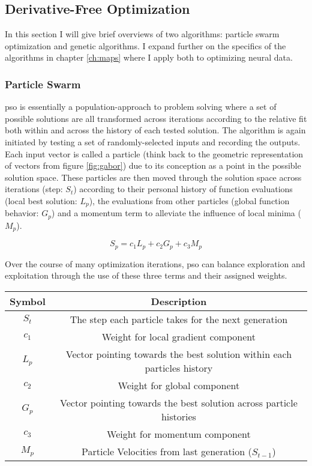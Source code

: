 \subsection{Derivative-Free Optimization}
\label{sec:DerivF}
In this section I will give brief overviews of two algorithms: particle swarm optimization and genetic algorithms. I expand further on the specifics of the algorithms in chapter \ref{ch:maps} where I apply both to optimizing neural data.

\subsubsection*{Particle Swarm}

\gls{pso} is essentially a population-approach to problem solving where a set of possible solutions are all transformed across iterations according to the relative fit both within and across the history of each tested solution. The algorithm is again initiated by testing a set of randomly-selected inputs and recording the outputs. Each input vector is called a particle (think back to the geometric representation of vectors from figure \ref{fig:gabor}) due to its conception as a point in the possible solution space. These particles are then moved through the solution space across iterations (step: $S_t$) according to their personal history of function evaluations (local best solution: $L_p$), the evaluations from other particles (global function behavior: $G_p$) and a momentum term to alleviate the influence of local minima ($M_p$).

\begin{equation}
	S_p= c_1 L_p+ c_2  G_p + c_3 M_p
\end{equation}

Over the course of many optimization iterations, \gls{pso} can balance exploration and exploitation through the use of these three terms and their assigned weights.

\begin{table}[b]
	\centering
	\begin{tabular}{|c|c|}
		\hline
		\textbf{Symbol}       & \textbf{Description} \\
		\hline
		$S_t$      			 & The step each particle takes for the next generation \\
		$c_1$  				 & Weight for local gradient component  \\
		$L_p$   			 & Vector pointing towards the best solution within each particles history \\
		$c_2$         	     & Weight for global component \\
		$G_p$             	 &  Vector pointing towards the best solution across particle histories \\
		$c_3$             	 &  Weight for momentum component \\
		$M_p$             	 &  Particle Velocities from last generation ($S_{t-1}$)\\
		\hline
	\end{tabular}
	\label{tbl:symbols}
\end{table}

